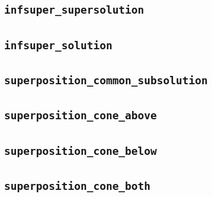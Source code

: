 \documentclass[11pt]{amsart}
\theoremstyle{definition}
\begin{document}
\subsection{\texorpdfstring{\texttt{infsuper\_supersolution}}{infsuper_supersolution}}\label{node:infsuper_supersolution}


\subsection{\texorpdfstring{\texttt{infsuper\_solution}}{infsuper_solution}}\label{node:infsuper_solution}


\subsection{\texorpdfstring{\texttt{superposition\_common\_subsolution}}{superposition_common_subsolution}}\label{node:superposition_common_subsolution}


\subsection{\texorpdfstring{\texttt{superposition\_cone\_above}}{superposition_cone_above}}\label{node:superposition_cone_above}


\subsection{\texorpdfstring{\texttt{superposition\_cone\_below}}{superposition_cone_below}}\label{node:superposition_cone_below}


\subsection{\texorpdfstring{\texttt{superposition\_cone\_both}}{superposition_cone_both}}\label{node:superposition_cone_both}

\end{document}
